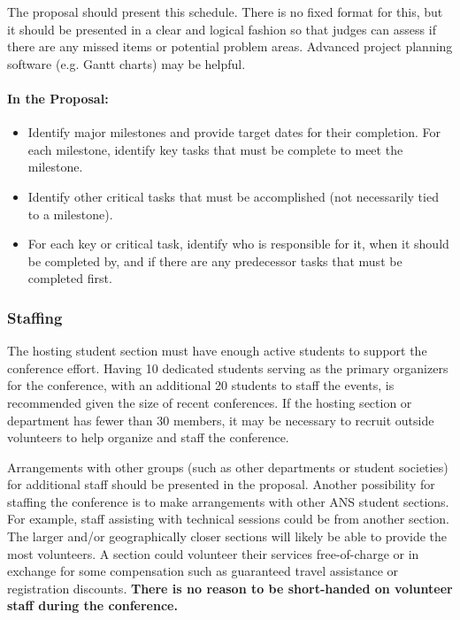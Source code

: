 \documentclass[12pt]{article}
\begin{document}
The proposal should present this schedule. There is no fixed format for this, but it
should be presented in a clear and logical fashion so that judges can assess if there are
any missed items or potential problem areas. Advanced project planning
software (e.g. Gantt charts) may be helpful.

\paragraph{In the Proposal:}
\begin{itemize}
\item{Identify major milestones and provide target dates for their completion. For each
milestone, identify key tasks that must be complete to meet the milestone.}
\item{Identify other critical tasks that must be accomplished (not necessarily tied to a
milestone).}
\item{For each key or critical task, identify who is responsible for it, when it should be
completed by, and if there are any predecessor tasks that must be completed first.}
\end{itemize}

\subsubsection{Staffing}
The hosting student section must have enough active students to support the conference effort. Having 10 dedicated students serving as the primary organizers for
the conference, with an additional 20 students to staff the events, is recommended given the size of recent conferences. If the hosting section or department has fewer than 30 members, it may be necessary to recruit outside volunteers to help organize and staff the conference.

Arrangements with other groups (such as other departments or student societies) for additional staff should be presented in the proposal.
Another possibility for staffing the conference is to make arrangements with other ANS student sections. For
example, staff assisting with technical sessions could  be from another section.
The larger and/or geographically closer sections will likely be able to provide the most
volunteers. A section could volunteer their services free-of-charge or in exchange for
some compensation such as guaranteed travel assistance or registration discounts.
\textbf{There is no reason to be short-handed on volunteer staff during the conference.}
\end{document}
